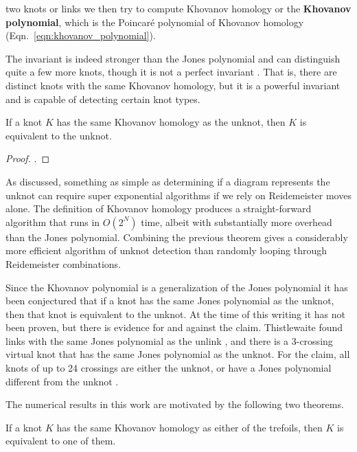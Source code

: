     two knots or links we then try to compute Khovanov homology or the
    \textbf{Khovanov polynomial}, which is the Poincar\'{e} polynomial of
    Khovanov homology (Eqn.~\ref{eqn:khovanov_polynomial}).
    \par\hfill\par
    The invariant is indeed stronger than the Jones polynomial and can
    distinguish quite a few more knots, though it is not a perfect
    invariant \cite{Watson2007KnotsWI}. That is, there are
    distinct knots with the same Khovanov homology, but it is a powerful
    invariant and is capable of detecting certain knot types.
    \begin{theorem}
        If a knot $K$ has the same Khovanov homology as the unknot, then $K$
        is equivalent to the unknot.
    \end{theorem}
    \begin{proof}
        \cite{KronheimerMrowka2011KhovanovUnknot}.
    \end{proof}
    As discussed, something as simple as determining if a diagram represents
    the unknot can require super exponential algorithms if we rely on
    Reidemeister moves alone. The definition of Khovanov homology produces a
    straight-forward algorithm that runs in $O(2^{N})$ time, albeit with
    substantially more overhead than the Jones polynomial. Combining the
    previous theorem gives a considerably more efficient algorithm of
    unknot detection than randomly looping through Reidemeister combinations.
    \par\hfill\par
    Since the Khovanov polynomial is a generalization of
    the Jones polynomial it has been conjectured that if a
    knot has the same Jones polynomial as the unknot, then that knot is
    equivalent to the unknot. At the time of this writing it has not been
    proven, but there is evidence for and against the claim.
    Thistlewaite found links with the same Jones polynomial as the unlink
    \cite{Thistlethwaite2001LINKSWT}, and there is a 3-crossing virtual
    knot that has the same Jones polynomial as the unknot. For the claim,
    all knots of up to 24 crossings are either the unknot, or have a
    Jones polynomial different from the unknot
    \cite{VerificationUnknotJonesConjUpTo24}.
    \par\hfill\par
    The numerical results in this work are motivated by the following two
    theorems.
    \begin{theorem}
        If a knot $K$ has the same Khovanov homology as either of the
        trefoils, then $K$ is equivalent to one of them.
    \end{theorem}
